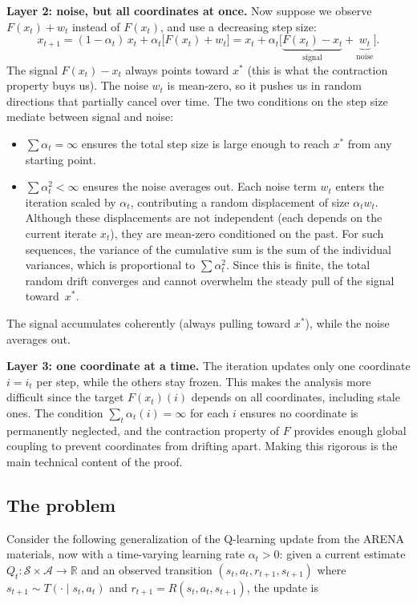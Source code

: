 \documentclass[11pt]{article}
\newcommand{\cS}{\mathcal{S}}
\newcommand{\cA}{\mathcal{A}}
\begin{document}
\textbf{Layer 2: noise, but all coordinates at once.}
Now suppose we observe $F(x_t) + w_t$ instead of $F(x_t)$, and use a decreasing step size:
$$
x_{t+1} = (1 - \alpha_t)\,x_t + \alpha_t\bigl[F(x_t) + w_t\bigr] = x_t + \alpha_t\bigl[\underbrace{F(x_t) - x_t}_{\text{signal}} + \underbrace{w_t}_{\text{noise}}\bigr].
$$
The signal $F(x_t) - x_t$ always points toward $x^*$ (this is what the contraction property buys us). The noise $w_t$ is mean-zero, so it pushes us in random directions that partially cancel over time. The two conditions on the step size mediate between signal and noise:
\begin{itemize}
\item $\sum \alpha_t = \infty$ ensures the total step size is large enough to reach $x^*$ from any starting point.
\item $\sum \alpha_t^2 < \infty$ ensures the noise averages out. Each noise term $w_t$ enters the iteration scaled by $\alpha_t$, contributing a random displacement of size $\alpha_t w_t$. Although these displacements are not independent (each depends on the current iterate $x_t$), they are mean-zero conditioned on the past. For such sequences, the variance of the cumulative sum is the sum of the individual variances, which is proportional to $\sum \alpha_t^2$. Since this is finite, the total random drift converges and cannot overwhelm the steady pull of the signal toward~$x^*$.
\end{itemize}
The signal accumulates coherently (always pulling toward $x^*$), while the noise averages out.

\textbf{Layer 3: one coordinate at a time.}
The iteration updates only one coordinate $i = i_t$ per step, while the others stay frozen. This makes the analysis more difficult since the target $F(x_t)(i)$ depends on all coordinates, including stale ones. The condition $\sum_t \alpha_t(i) = \infty$ for each $i$ ensures no coordinate is permanently neglected, and the contraction property of $F$ provides enough global coupling to prevent coordinates from drifting apart. Making this rigorous is the main technical content of the proof.

\subsection*{The problem}

Consider the following generalization of the Q-learning update from the ARENA materials, now with a time-varying learning rate $\alpha_t > 0$: given a current estimate $Q_t : \cS \times \cA \to \mathbb{R}$ and an observed transition $(s_t, a_t, r_{t+1}, s_{t+1})$ where $s_{t+1} \sim T(\cdot \mid s_t, a_t)$ and $r_{t+1} = R(s_t, a_t, s_{t+1})$, the update is
\end{document}
